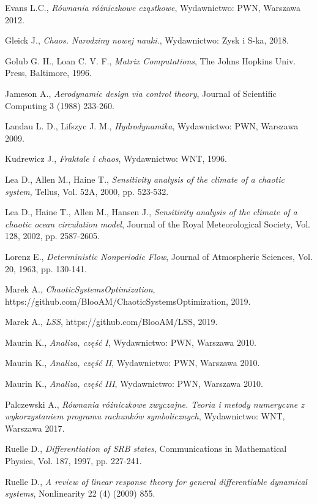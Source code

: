 \documentclass[12pt]{article}
\begin{document}
\begin{thebibliography}{99}
 Evans L.C.,
\emph{Równania różniczkowe cząstkowe},
Wydawnictwo: PWN, Warszawa 2012.

 Gleick J.,
\emph{Chaos. Narodziny nowej nauki.},
Wydawnictwo: Zysk i S-ka, 2018.

 Golub G. H., Loan C. V. F.,
\emph{Matrix Computations},
The Johns Hopkins Univ. Press, Baltimore, 1996.

 Jameson A.,
\emph{Aerodynamic design via control theory},
Journal of Scientific Computing 3 (1988) 233-260.

 Landau L. D., Lifszyc J. M.,
\emph{Hydrodynamika},
Wydawnictwo: PWN, Warszawa 2009.

 Kudrewicz J., 
\emph{Fraktale i chaos},
Wydawnictwo: WNT, 1996.

 Lea D., Allen M., Haine T.,
\emph{Sensitivity analysis of the climate of a chaotic system},
Tellus, Vol. 52A, 2000, pp. 523-532.

 Lea D., Haine T., Allen M., Hansen J., 
\emph{Sensitivity analysis of the climate of a chaotic ocean circulation model},
Journal of the Royal Meteorological Society, Vol. 128, 2002, pp. 2587-2605.

 Lorenz E.,
\emph{Deterministic Nonperiodic Flow},
Journal of Atmospheric Sciences, Vol. 20, 1963, pp. 130-141.

 Marek A.,
\emph{ChaoticSystemsOptimization},
https://github.com/BlooAM/ChaoticSystemsOptimization, 2019.

 Marek A.,
\emph{LSS},
https://github.com/BlooAM/LSS, 2019.

 Maurin K.,
\emph{Analiza, część I},
Wydawnictwo: PWN, Warszawa 2010.

 Maurin K.,
\emph{Analiza, część II},
Wydawnictwo: PWN, Warszawa 2010.

 Maurin K.,
\emph{Analiza, część III},
Wydawnictwo: PWN, Warszawa 2010.

 Palczewski A.,
\emph{Równania różniczkowe zwyczajne. Teoria i metody numeryczne z wykorzystaniem programu rachunków symbolicznych},
Wydawnictwo: WNT, Warszawa 2017.

 Ruelle D.,
\emph{Differentiation of SRB states},
Communications in Mathematical Physics, Vol. 187, 1997, pp. 227-241.

 Ruelle D.,
\emph{ A review of linear response theory for general differentiable dynamical systems},
Nonlinearity 22 (4) (2009) 855.


\end{thebibliography}
\end{document}
